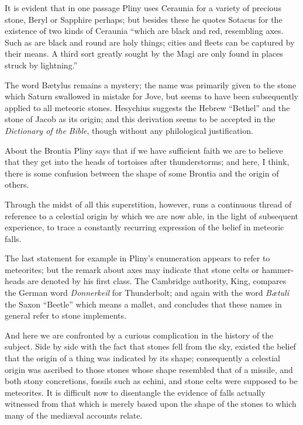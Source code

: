 \documentclass[a4paper, 12pt, oneside]{article}
\begin{document}
It is evident that in one passage Pliny uses Ceraunia for a variety of precious stone, Beryl or Sapphire perhaps; but besides these he quotes Sotacus for the existence of two kinds of Ceraunia ``which are black and red, resembling axes. Such as are black and round are holy things; cities and fleets can be captured by their means. A third sort greatly sought by the Magi are only found in places struck by lightning.'' 

The word Bætylus remains a mystery; the name was primarily given to the stone which Saturn swallowed in mistake for Jove, but seems to have been subsequently applied to all meteoric stones. Hesychius suggests the Hebrew ``Bethel'' and the stone of Jacob as its origin; and this derivation seems to be accepted in the \emph{Dictionary of the Bible}, though without any philological justification. 

About the Brontia Pliny says that if we have sufficient faith we are to believe that they get into the heads of tortoises after thunderstorms; and here, I think, there is some confusion between the shape of some Brontia and the origin of others. 

Through the midst of all this superstition, however, runs a continuous thread of reference to a celestial origin by which we are now able, in the light of subsequent experience, to trace a constantly recurring expression of the belief in meteoric falls. 

The last statement for example in Pliny's enumeration appears to refer to meteorites; but the remark about axes may indicate that stone celts or hammer-heads are denoted by his first class. The Cambridge authority, King, compares the German word \emph{Donnerkeil} for Thunderbolt; and again with the word \emph{Bætuli} the Saxon ``Beetle'' which means a mallet, and concludes that these names in general refer to stone implements. 

And here we are confronted by a curious complication in the history of the subject. Side by side with the fact that stones fell from the sky, existed the belief that the origin of a thing was indicated by its shape; consequently a celestial origin was ascribed to those stones whose shape resembled that of a missile, and both stony concretions, fossils such as echini, and stone celts were supposed to be meteorites. It is difficult now to disentangle the evidence of falls actually witnessed from that which is merely based upon the shape of the stones to which many of the mediæval accounts relate. 
\end{document}
